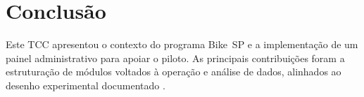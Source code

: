 
\chapter{Conclusão}
\label{cap:conclusao}

Este TCC apresentou o contexto do programa Bike~SP e a implementação de um
painel administrativo para apoiar o piloto. As principais contribuições foram a
estruturação de módulos voltados à operação e análise de dados, alinhados ao
desenho experimental documentado \citep{faria2023:bikespCaseStudy}.


